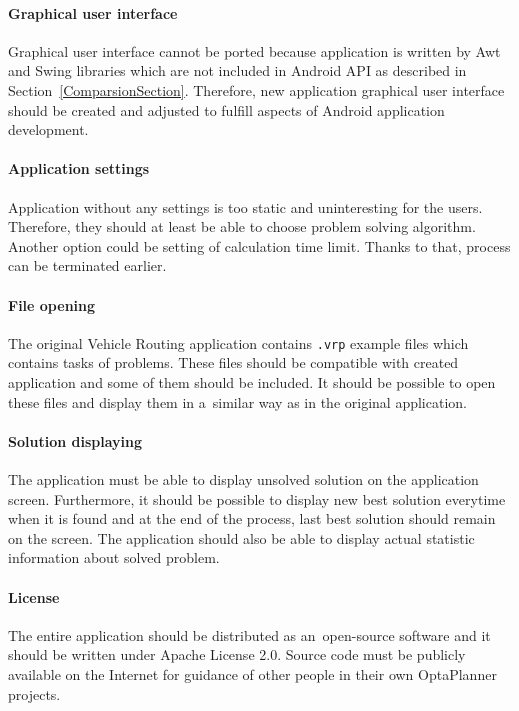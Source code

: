 \paragraph{Graphical user interface}
Graphical user interface cannot be ported because application is written by Awt and Swing libraries which are not
included in Android API as described in Section~\ref{ComparsionSection}. Therefore, new application graphical user
interface should be created and adjusted to fulfill aspects of Android application development.

\paragraph{Application settings}
Application without any settings is too static and uninteresting for the users. Therefore, they should at least be able
to choose problem solving algorithm. Another option could be setting of calculation time limit. Thanks to that, process
can be terminated earlier.

\paragraph{File opening}
The original Vehicle Routing application contains \texttt{.vrp} example files which contains tasks of problems. These
files should be compatible with created application and some of them should be included. It should be possible to open
these files and display them in a~similar way as in the original application.

\paragraph{Solution displaying}
The application must be able to display unsolved solution on the application screen. Furthermore, it should be possible
to display new best solution everytime when it is found and at the end of the process, last best solution should remain
on the screen. The application should also be able to display actual statistic information about solved problem.

\paragraph{License}
The entire application should be distributed as an~open-source software and it should be written under Apache License
2.0. Source code must be publicly available on the Internet for guidance of other people in their own OptaPlanner
projects.


